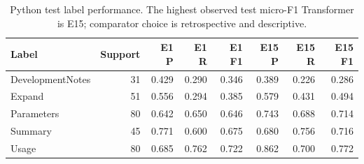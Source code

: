 \begin{table}[htbp]
\centering\small
\caption{Python test label performance. The highest observed test micro-F1 Transformer is E15; comparator choice is retrospective and descriptive.}\label{tab:pythonlabels}
\begin{tabular}{lrrrrrrr}\toprule
Label & Support & E1 P & E1 R & E1 F1 & E15 P & E15 R & E15 F1\\\midrule
DevelopmentNotes & 31 & 0.429 & 0.290 & 0.346 & 0.389 & 0.226 & 0.286\\
Expand & 51 & 0.556 & 0.294 & 0.385 & 0.579 & 0.431 & 0.494\\
Parameters & 80 & 0.642 & 0.650 & 0.646 & 0.743 & 0.688 & 0.714\\
Summary & 45 & 0.771 & 0.600 & 0.675 & 0.680 & 0.756 & 0.716\\
Usage & 80 & 0.685 & 0.762 & 0.722 & 0.862 & 0.700 & 0.772\\
\bottomrule\end{tabular}
\end{table}
